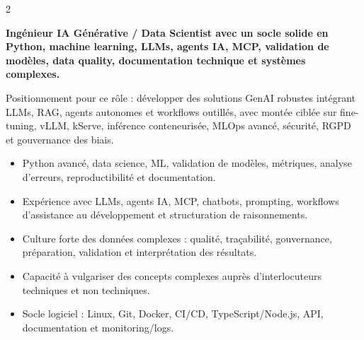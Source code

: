 \documentclass[8pt,a4paper,ragged2e,withhyper]{altacv}
\begin{document}
\begin{paracol}{2}
\switchcolumn


\textbf{Ingénieur IA Générative / Data Scientist avec un socle solide en Python, machine learning, LLMs, agents IA, MCP, validation de modèles, data quality, documentation technique et systèmes complexes.}

Positionnement pour ce rôle : développer des solutions GenAI robustes intégrant LLMs, RAG, agents autonomes et workflows outillés, avec montée ciblée sur fine-tuning, vLLM, kServe, inférence conteneurisée, MLOps avancé, sécurité, RGPD et gouvernance des biais.

\begin{itemize}
  \item Python avancé, data science, ML, validation de modèles, métriques, analyse d’erreurs, reproductibilité et documentation.
  \item Expérience avec LLMs, agents IA, MCP, chatbots, prompting, workflows d’assistance au développement et structuration de raisonnements.
  \item Culture forte des données complexes : qualité, traçabilité, gouvernance, préparation, validation et interprétation des résultats.
  \item Capacité à vulgariser des concepts complexes auprès d’interlocuteurs techniques et non techniques.
  \item Socle logiciel : Linux, Git, Docker, CI/CD, TypeScript/Node.js, API, documentation et monitoring/logs.
\end{itemize}


\divider
{}
\divider

\medskip



\divider


\divider


\divider



\end{paracol}
\end{document}
